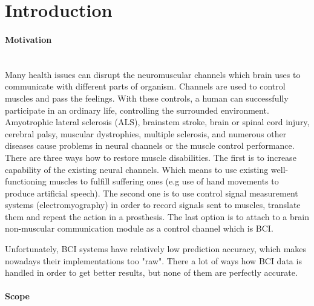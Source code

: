\documentclass[12pt]{article}
\newcommand{\TODO}{\todo[inline]}
\begin{document}


\newpage
\tableofcontents

\newpage
\section{Introduction}
\paragraph{Motivation}~\\

Many health issues can disrupt the neuromuscular channels which brain uses to communicate with different parts of organism. Channels are used to control muscles and pass the feelings. With these controls, a human can successfully participate in an ordinary life, controlling the surrounded environment. Amyotrophic lateral sclerosis (ALS), brainstem stroke, brain or spinal cord injury, cerebral palsy, muscular dystrophies, multiple sclerosis, and numerous other diseases cause problems in neural channels or the muscle control performance. There are three ways how to restore muscle disabilities. The first is to increase capability of the existing neural channels. Which means to use existing well-functioning muscles to fulfill suffering ones (e.g use of hand movements to produce artificial speech). The second one is to use control signal measurement systems (electromyography) in order to record signals sent to muscles, translate them and repeat the action in a prosthesis. The last option is to attach to a brain non-muscular communication module as a control channel which is BCI.\cite{bci_jonathan}

Unfortunately, BCI systems have relatively low prediction accuracy, which makes nowadays their implementations too "raw". There a lot of ways how BCI data is handled in order to get better results, but none of them are perfectly accurate.
\paragraph{Scope}~\\
\end{document}
